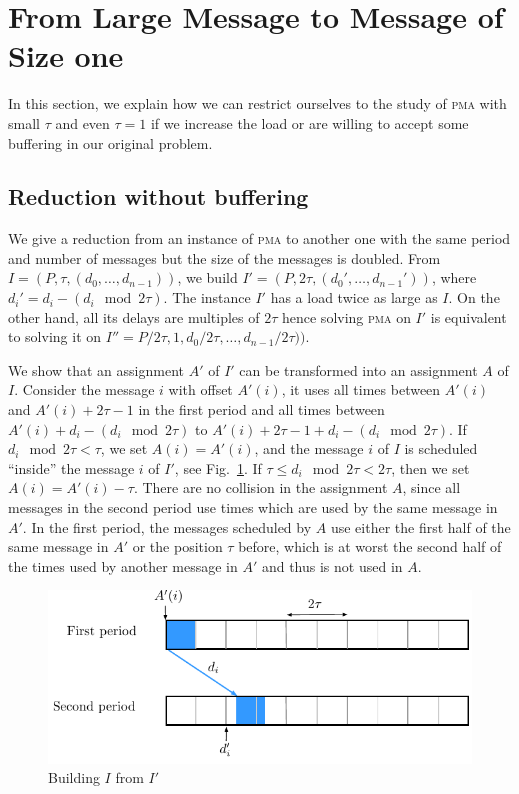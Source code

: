 \documentclass[10pt, conference, letterpaper]{IEEEtran}
\newcommand\pma{\textsc{pma}\xspace}
\begin{document}
 

\section{From Large Message to Message of Size one}\label{sec:reduction}

In this section, we explain how we can restrict ourselves to the study of \pma
with small $\tau$ and even $\tau = 1$ if we increase the load or are willing to accept some buffering in our original problem.


\subsection{Reduction without buffering}

We give a reduction from an instance of \pma to another one with the same period and number of messages but 
the size of the messages is doubled. From $I = (P,\tau,(d_{0},\dots,d_{n-1}))$, we build $I' = (P, 2\tau, (d_{0}',\dots,d_{n-1}'))$, where $d_i' = d_{i} - (d_{i} \mod 2\tau)$. The instance $I'$ has a load twice as large as $I$.
On the other hand, all its delays are multiples of $2\tau$ hence solving \pma on $I'$ is equivalent to solving it on $I'' = P/2\tau, 1,d_{0}/ 2\tau,\dots,d_{n-1} /2\tau))$. 

We show that an assignment $A'$ of $I'$ can be transformed into an assignment $A$ of $I$. 
Consider the message $i$ with offset $A'(i)$, it uses all times between $A'(i)$ and $A'(i) + 2\tau -1$ in the first period and all times between $A'(i) + d_{i} - (d_{i} \mod 2\tau)$ to $A'(i) + 2\tau -1+ d_{i} - (d_{i} \mod 2\tau)$. 
If $d_{i} \mod 2\tau < \tau $, we set $A(i) = A'(i)$, and the message $i$ of $I$ is scheduled ``inside'' the 
message $i$ of $I'$, see Fig.~\ref{fig:transf_2tau}. If $\tau \leq d_{i} \mod 2\tau < 2\tau$, then we set 
$A(i) = A'(i) - \tau$. There are no collision in the assignment $A$, since all messages in the second period use
times which are used by the same message in $A'$. In the first period, the messages scheduled by $A$ use either the first
half of the same message in $A'$ or the position $\tau$ before, which is at worst the second half of the times used by another message in $A'$ and thus is not used in $A$.

\begin{figure}[h]
\begin{center}

\includegraphics[scale=0.7]{transfo2tau}
\end{center}
\caption{Building $I$ from $I'$}
\label{fig:transf_2tau}
\end{figure}
\end{document}
